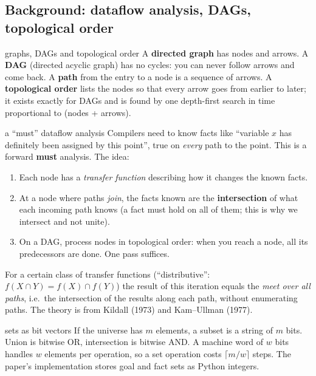 \subsection{Background: dataflow analysis, DAGs, topological order}

\begin{toolbox}{graphs, DAGs and topological order}
A \textbf{directed graph} has nodes and arrows. A \textbf{DAG} (directed acyclic graph) has no cycles: you can never follow arrows and come back. A \textbf{path} from the entry to a node is a sequence of arrows. A \textbf{topological order} lists the nodes so that every arrow goes from earlier to later; it exists exactly for DAGs and is found by one depth-first search in time proportional to (nodes + arrows).
\end{toolbox}

\begin{toolbox}{a ``must'' dataflow analysis}
Compilers need to know facts like ``variable $x$ has definitely been assigned by this point'', true on \emph{every} path to the point. This is a forward \textbf{must} analysis. The idea:
\begin{enumerate}
\item Each node has a \emph{transfer function} describing how it changes the known facts.
\item At a node where paths \emph{join}, the facts known are the \textbf{intersection} of what each incoming path knows (a fact must hold on all of them; this is why we intersect and not unite).
\item On a DAG, process nodes in topological order: when you reach a node, all its predecessors are done. One pass suffices.
\end{enumerate}
For a certain class of transfer functions (``distributive'': $f(X\cap Y)=f(X)\cap f(Y)$) the result of this iteration equals the \emph{meet over all paths}, i.e.\ the intersection of the results along each path, without enumerating paths. The theory is from Kildall (1973) and Kam--Ullman (1977).
\end{toolbox}

\begin{toolbox}{sets as bit vectors}
If the universe has $m$ elements, a subset is a string of $m$ bits. Union is bitwise OR, intersection is bitwise AND. A machine word of $w$ bits handles $w$ elements per operation, so a set operation costs $\lceil m/w\rceil$ steps. The paper's implementation stores goal and fact sets as Python integers.
\end{toolbox}

